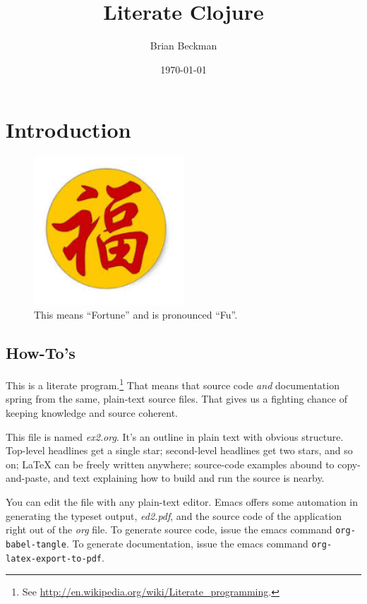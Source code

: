\documentclass[11pt]{article}
\author{Brian Beckman}
\date{\today}
\title{Literate Clojure}
\begin{document}
\maketitle
\tableofcontents


\section{Introduction}
\label{sec-1}
\begin{figure}
  \centering
  \includegraphics[width=0.5\textwidth]{FuFortune2.png}
  \caption{\label{fig:fufortune}This means ``Fortune'' and is pronounced ``Fu''.}
\end{figure}

\subsection{How-To's}
\label{sec-1-1}
This is a literate program.\footnote{See
  \url{http://en.wikipedia.org/wiki/Literate_programming}.} That means that
source code \emph{and} documentation spring from the same, plain-text
source files. That gives us a fighting chance of keeping knowledge
and source coherent.

This file is named \emph{ex2.org}. It's an outline in plain text with
obvious structure. Top-level headlines get a single star;
second-level headlines get two stars, and so on; \LaTeX{} can be
freely written anywhere; source-code examples abound to
copy-and-paste, and text explaining how to build and run the source
is nearby.

You can edit the file with any plain-text editor. Emacs offers some
automation in generating the typeset output, \emph{ed2.pdf}, and the
source code of the application right out of the \emph{org} file. To
generate source code, issue the emacs command
\verb|org-babel-tangle|. To generate documentation, issue the emacs
command \verb|org-latex-export-to-pdf|.
\end{document}
